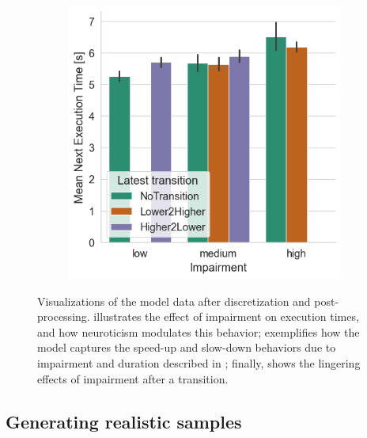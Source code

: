 \begin{figure}
\begin{subfigure}[t]{.28\textwidth}
        \caption{}\label{fig:timing:durvsetime}
    \end{subfigure}%
    \hspace{.05\textwidth}%
    \begin{subfigure}[t]{.28\textwidth}
        \centering
        \includegraphics[width=\textwidth]{./model_data/impairment_transition_vs_exectime.png}
        \caption{}\label{fig:timing:imptransvsetime}
    \end{subfigure}
    \caption{%
        Visualizations of the model data after discretization and post-processing.
         illustrates the effect of impairment on execution times, and how neuroticism modulates this behavior;
         exemplifies how the model captures the speed-up and slow-down behaviors due to impairment and duration described in \textcite{olguinmunoz:impact2021};
        finally,  shows the lingering effects of impairment after a transition.
    }\label{fig:timing}
\end{figure}

\subsection{Generating realistic samples}\label{ssec:model:frames}

